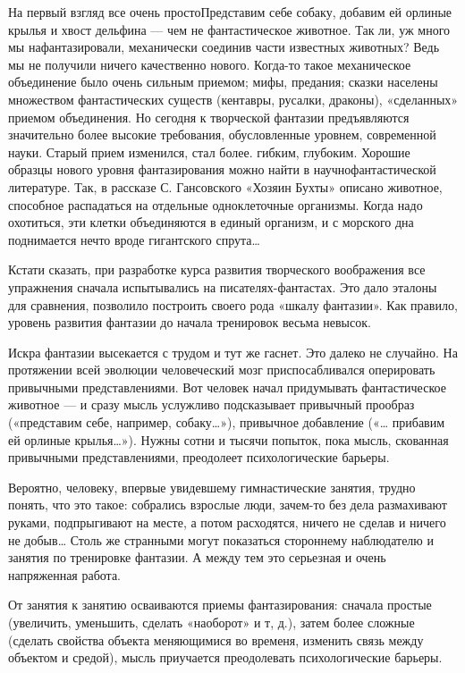 На первый  взгляд  все  очень простоПредставим  себе  собаку,  добавим  ей
орлиные крылья и хвост дельфина — чем не фантастическое животное. Так  ли,
уж  много  мы  нафантазировали,   механически  соединив  части   известных
животных? Ведь мы  не получили ничего  качественно нового. Когда-то  такое
механическое объединение  было  очень  сильным  приемом;  мифы,  предания;
сказки населены  множеством  фантастических  существ  (кентавры,  русалки,
драконы),  «сделанных»  приемом  объединения.  Но  сегодня  к   творческой
фантазии предъявляются значительно более высокие требования, обусловленные
уровнем, современной науки.  Старый прием изменился,  стал более.  гибким,
глубоким. Хорошие  образцы  нового  уровня фантазирования  можно  найти  в
научнофантастической литературе. Так,  в рассказе  С. Гансовского  «Хозяин
Бухты» описано животное, способное распадаться на отдельные  одноклеточные
организмы.  Когда  надо  охотиться,  эти  клетки  объединяются  в   единый
организм, и с морского дна поднимается нечто вроде гигантского спрута…

Кстати сказать, при разработке курса развития творческого воображения  все
упражнения сначала испытывались на  писателях-фантастах. Это дало  эталоны
для сравнения,  позволило  построить  своего рода  «шкалу  фантазии».  Как
правило, уровень развития фантазии до начала тренировок весьма невысок.

Искра фантазии  высекается  с  трудом  и тут  же  гаснет.  Это  далеко  не
случайно. На протяжении всей  эволюции человеческий мозг  приспосабливался
оперировать привычными  представлениями.  Вот  человек  начал  придумывать
фантастическое животное — и  сразу мысль услужливо подсказывает  привычный
прообраз («представим себе, например, собаку…»), привычное добавление  («…
прибавим ей орлиные крылья…»). Нужны  сотни и тысячи попыток, пока  мысль,
скованная привычными представлениями, преодолеет психологические барьеры.

Вероятно, человеку,  впервые  увидевшему  гимнастические  занятия,  трудно
понять,  что  это  такое:  собрались  взрослые  люди,  зачем-то  без  дела
размахивают руками, подпрыгивают на месте,  а потом расходятся, ничего  не
сделав и ничего не добыв…  Столь же странными могут показаться  стороннему
наблюдателю и занятия по тренировке фантазии. А между тем это серьезная  и
очень напряженная работа.

От занятия к  занятию осваиваются приемы  фантазирования: сначала  простые
(увеличить, уменьшить, сделать  «наоборот» и т,  д.), затем более  сложные
(сделать свойства  объекта меняющимися  во временя,  изменить связь  между
объектом и средой), мысль приучается преодолевать психологические барьеры.


